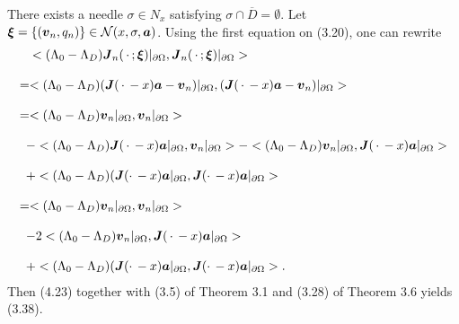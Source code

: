 There exists a needle $\sigma\in N_x$ satisfying $\sigma\cap\overline{D}=\emptyset$.
Let $\mbox{\boldmath $\xi$}=\{(\mbox{\boldmath $v$}_n,q_n)\}\in{\cal N}(x,\sigma,\mbox{\boldmath $a$})$.
Using the first equation on (3.20), one can rewrite
$$\begin{array}{l}
\displaystyle
\,\,\,\,\,\,
<(\Lambda_0-\Lambda_D)\mbox{\boldmath $J$}_n(\,\cdot\,;\mbox{\boldmath $\xi$})\vert_{\partial\Omega},
\mbox{\boldmath $J$}_n(\,\cdot\,;\mbox{\boldmath $\xi$})\vert_{\partial\Omega}>
\\
\\
\displaystyle
=<(\Lambda_0-\Lambda_D)(\mbox{\boldmath $J$}(\,\cdot\,-x)\mbox{\boldmath $a$}-\mbox{\boldmath $v$}_n)\vert_{\partial\Omega},
(\mbox{\boldmath $J$}(\,\cdot\,-x)\mbox{\boldmath $a$}-\mbox{\boldmath $v$}_n)\vert_{\partial\Omega}>
\\
\\
\displaystyle
=<(\Lambda_0-\Lambda_D)\mbox{\boldmath $v$}_n\vert_{\partial\Omega},
\mbox{\boldmath $v$}_n\vert_{\partial\Omega}>\\
\\
\displaystyle
\,\,\,
-<(\Lambda_0-\Lambda_D)\mbox{\boldmath $J$}(\,\cdot\,-x)\mbox{\boldmath $a$}\vert_{\partial\Omega},
\mbox{\boldmath $v$}_n\vert_{\partial\Omega}>
-<(\Lambda_0-\Lambda_D)\mbox{\boldmath $v$}_n\vert_{\partial\Omega},
\mbox{\boldmath $J$}(\,\cdot\,-x)\mbox{\boldmath $a$}\vert_{\partial\Omega}>
\\
\\
\displaystyle
\,\,\,
+
<(\Lambda_0-\Lambda_D)(\mbox{\boldmath $J$}(\cdot\,-x)\mbox{\boldmath $a$}\vert_{\partial\Omega},\mbox{\boldmath $J$}(\cdot\,-x)\mbox{\boldmath $a$}\vert_{\partial\Omega}>
\\
\\
\displaystyle
=<(\Lambda_0-\Lambda_D)\mbox{\boldmath $v$}_n\vert_{\partial\Omega},
\mbox{\boldmath $v$}_n\vert_{\partial\Omega}>
\\
\\
\displaystyle
\,\,\,
-2<(\Lambda_0-\Lambda_D)\mbox{\boldmath $v$}_n\vert_{\partial\Omega},
\mbox{\boldmath $J$}(\,\cdot\,-x)\mbox{\boldmath $a$}\vert_{\partial\Omega}>
\\
\\
\displaystyle
\,\,\,
+
<(\Lambda_0-\Lambda_D)(\mbox{\boldmath $J$}(\cdot\,-x)\mbox{\boldmath $a$}\vert_{\partial\Omega},\mbox{\boldmath $J$}(\cdot\,-x)\mbox{\boldmath $a$}\vert_{\partial\Omega}>.
\end{array}
$$
Then (4.23) together with (3.5) of  Theorem 3.1 and  (3.28) of Theorem 3.6 yields (3.38).


